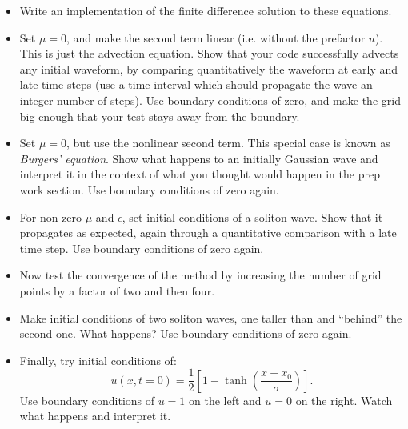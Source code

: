 \documentclass[11pt, preprint]{aastex}
\begin{document}
\begin{itemize}
\item Write an implementation of the finite difference solution to
  these equations.
\item Set $\mu = 0$, and make the second term linear (i.e. without the
  prefactor $u$). This is just the advection equation. Show that your
  code successfully advects any initial waveform, by comparing
  quantitatively the waveform at early and late time steps (use a time
  interval which should propagate the wave an integer number of
  steps). Use boundary conditions of zero, and make the grid big
  enough that your test stays away from the boundary.
\item Set $\mu = 0$, but use the nonlinear second term. This
  special case is known as {\it Burgers' equation}. Show what happens
  to an initially Gaussian wave and interpret it in the context of
  what you thought would happen in the prep work section. Use boundary
  conditions of zero again.
\item For non-zero $\mu$ and $\epsilon$, set initial conditions of a
  soliton wave. Show that it propagates as expected, again through a
  quantitative comparison with a late time step. Use boundary
  conditions of zero again.
\item Now test the convergence of the method by increasing the number
  of grid points by a factor of two and then four.
\item Make initial conditions of two soliton waves, one taller than
  and ``behind'' the second one. What happens? Use boundary conditions
  of zero again.
\item Finally, try initial conditions of:
  \begin{equation}
    u(x, t=0) = \frac{1}{2} \left[1 -
      \tanh\left(\frac{x-x_0}{\sigma}\right)\right].
  \end{equation}
  Use boundary conditions of $u=1$ on the left and $u=0$ on the
  right. Watch what happens and interpret it.
\end{itemize}
\end{document}

